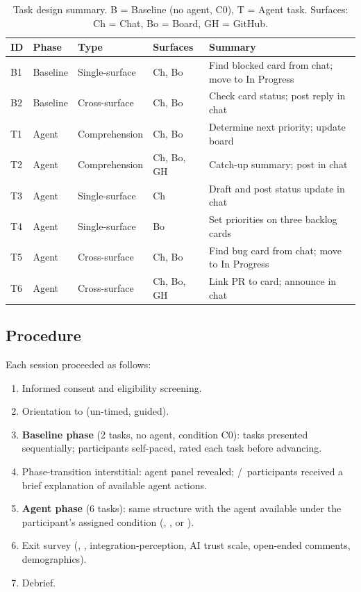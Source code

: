 \begin{table}[h]
  \caption{Task design summary. B = Baseline (no agent, C0), T = Agent task.
    Surfaces: Ch = Chat, Bo = Board, GH = GitHub.}
  \label{tab:tasks}
  \begin{tabular}{lllll}
    \toprule
    ID & Phase & Type & Surfaces & Summary \\
    \midrule
    B1 & Baseline & Single-surface & Ch, Bo & Find blocked card from chat; move to In Progress \\
    B2 & Baseline & Cross-surface  & Ch, Bo & Check card status; post reply in chat \\
    \midrule
    T1 & Agent & Comprehension  & Ch, Bo     & Determine next priority; update board \\
    T2 & Agent & Comprehension  & Ch, Bo, GH & Catch-up summary; post in chat \\
    T3 & Agent & Single-surface & Ch         & Draft and post status update in chat \\
    T4 & Agent & Single-surface & Bo         & Set priorities on three backlog cards \\
    T5 & Agent & Cross-surface  & Ch, Bo     & Find bug card from chat; move to In Progress \\
    T6 & Agent & Cross-surface  & Ch, Bo, GH & Link PR to card; announce in chat \\
    \bottomrule
  \end{tabular}
\end{table}

\subsection{Procedure}
\label{sec:study:procedure}


Each session proceeded as follows:
\begin{enumerate}
  \item Informed consent and eligibility screening.
  \item Orientation to \Weld (un-timed, guided).
  \item \textbf{Baseline phase} (2 tasks, no agent, condition C0): tasks
    presented sequentially; participants self-paced, rated each task before
    advancing.
  \item Phase-transition interstitial: agent panel revealed; \CII/\CIII\
    participants received a brief explanation of available agent actions.
  \item \textbf{Agent phase} (6 tasks): same structure with the agent
    available under the participant's assigned condition (\CI, \CII, or
    \CIII).
  \item Exit survey (\NASATLX, \SUS, integration-perception, AI trust scale,
    open-ended comments, demographics).
  \item Debrief.
\end{enumerate}

